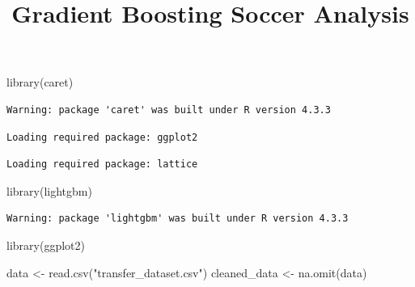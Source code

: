 \documentclass[
  letterpaper,
  DIV=11,
  numbers=noendperiod]{scrartcl}
\title{Gradient Boosting Soccer Analysis}
\author{}
\date{}
\newenvironment{Shaded}{\begin{snugshade}}{\end{snugshade}}
\newcommand{\FunctionTok}[1]{\textcolor[rgb]{0.28,0.35,0.67}{#1}}
\newcommand{\NormalTok}[1]{\textcolor[rgb]{0.00,0.23,0.31}{#1}}
\newcommand{\OtherTok}[1]{\textcolor[rgb]{0.00,0.23,0.31}{#1}}
\newcommand{\StringTok}[1]{\textcolor[rgb]{0.13,0.47,0.30}{#1}}
\begin{document}
\maketitle


\begin{Shaded}
\begin{Highlighting}[]
\FunctionTok{library}\NormalTok{(caret)}
\end{Highlighting}
\end{Shaded}

\begin{verbatim}
Warning: package 'caret' was built under R version 4.3.3
\end{verbatim}

\begin{verbatim}
Loading required package: ggplot2
\end{verbatim}

\begin{verbatim}
Loading required package: lattice
\end{verbatim}

\begin{Shaded}
\begin{Highlighting}[]
\FunctionTok{library}\NormalTok{(lightgbm)}
\end{Highlighting}
\end{Shaded}

\begin{verbatim}
Warning: package 'lightgbm' was built under R version 4.3.3
\end{verbatim}

\begin{Shaded}
\begin{Highlighting}[]
\FunctionTok{library}\NormalTok{(ggplot2)}
\end{Highlighting}
\end{Shaded}

\begin{Shaded}
\begin{Highlighting}[]
\NormalTok{data }\OtherTok{\textless{}{-}} \FunctionTok{read.csv}\NormalTok{(}\StringTok{"transfer\_dataset.csv"}\NormalTok{)}
\NormalTok{cleaned\_data }\OtherTok{\textless{}{-}} \FunctionTok{na.omit}\NormalTok{(data)}
\end{Highlighting}
\end{Shaded}
\end{document}

